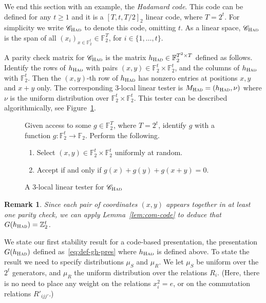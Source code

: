 \documentclass[11pt]{article}
\newtheorem{remark}[theorem]{Remark}
\theoremstyle{definition}
\newcommand{\code}{\mathscr{C}}
\newcommand{\field}{\mathbb{F}_2}
\newcommand{\F}{\ensuremath{\mathbb{F}}}
\newcommand{\Z}{\ensuremath{\mathbb{Z}}}
\newcommand{\had}{\textsc{Had}}
\newenvironment{gamespec}{
  \begin{mdframed}[style=figstyle]}{
  \end{mdframed}}
\begin{document}
We end this section with an example, the \emph{Hadamard code}. This code can be defined for any  $t\geq 1$ and it is a $[T,t,T/2]_2$ linear code, where $T=2^t$. For simplicity we write  $\code_\had$ to denote this code, omitting $t$. As a linear space, $\code_\had$ is the span of all $(x_i)_{x\in \field^t} \in \field^T$, for $i\in \{1,\ldots,t\}$.  

A parity check matrix for $\code_\had$ is the matrix $h_\had\in \F_2^{T^2\times T}$ defined as follows. Identify the rows of $h_\had$ with pairs $(x,y)\in \F_2^t\times \F_2^t$, and the columns of $h_\had$ with $\F_2^t$. Then the $(x,y)$-th row of $h_\had$ has nonzero entries at positions $x,y$ and $x+y$ only. 
The corresponding $3$-local linear tester is $M_\had = (h_\had,\nu)$ where $\nu$ is the uniform distribution over $\F_2^t \times \F_2^t$. This tester can be described algorithmically, see Figure~\ref{fig:test-had}. 

\begin{figure}[!htbp]
  \centering
  \begin{gamespec}
	Given access to some $g\in \F_2^T$, where $T=2^t$, identify $g$ with a function $g:\F_2^t\to\F_2$. Perform the following. 
\begin{enumerate}
\item Select $(x,y)\in \F_2^t \times \F_2^t$ uniformly at random. 
\item Accept if and only if $g(x)+g(y)+g(x+y)=0$.  	
    \end{enumerate}
  \end{gamespec}
  \caption{A $3$-local linear tester for $\code_{\had}$}
  \label{fig:test-had}
\end{figure}

\begin{remark}
Since each pair of coordinates $(x,y)$ appears together in at least one parity check, we can apply Lemma~\ref{lem:com-code} to deduce that $G(h_\had)=\Z_2^t$. 
\end{remark}

We state our first stability result for a code-based presentation, the presentation $G(h_\had)$ defined as~\eqref{eq:def-gh-pres} where $h_\had$ is defined above. To state the result we need to specify distributions $\mu_S$ and $\mu_R$. We let $\mu_S$ be uniform over the $2^t$ generators, and $\mu_R$ the uniform distribution over the relations $R_{i}$. (Here, there is no need to place any weight on the relations $x_i^2=e$, or on the commutation relations $R'_{ijj'}$.)  
\end{document}
